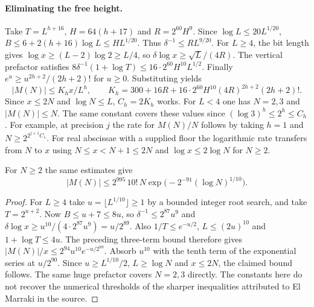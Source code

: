 \paragraph{Eliminating the free height.}
Take $T=L^{h+16}$, $H=64(h+17)$ and $R=2^{60}H^9$.
Since $\log L\le20 L^{1/20}$, $B\le6+2(h+16)\log L
\le H L^{1/20}$. Thus $\delta^{-1}\le R L^{9/20}$.
For $L\ge4$, the bit length gives
$\log x\ge(L-2)\log2\ge L/4$, so
$\delta\log x\ge\sqrt L/(4R)$. The vertical prefactor satisfies
$8\delta^{-1}(1+\log T)\le16\cdot2^{60}H^{10}L^{1/2}$.
Finally $e^u\ge u^{2h+2}/(2h+2)!$ for $u\ge0$. Substituting yields
\[
 |M(N)|\le K_h x/L^h,\qquad
 K_h=300+16R+
       16\cdot2^{60}H^{10}(4R)^{2h+2}(2h+2)! .
\]
Since $x\le2N$ and $\log N\le L$, $C_h=2K_h$ works. For $L<4$
one has $N=2,3$ and $|M(N)|\le N$. The same constant covers these
values since $(\log 3)^h\le2^h\le C_h$.
For example, at precision $j$ the rate for $M(N)/N$ follows by
taking $h=1$ and $N\ge 2^{2^{j+1}C_1}$. For real abscissae with a
supplied floor the logarithmic rate transfers from $N$ to $x$ using
$N\le x<N+1\le2N$ and $\log x\le2\log N$ for $N\ge2$.

\begin{corollary}
For $N\ge2$ the same estimates give
\[
 |M(N)|\le 2^{995}\,10!\,N
            \exp\bigl(-2^{-91}(\log N)^{1/10}\bigr).
\]
\end{corollary}
\begin{proof}
For $L\ge4$ take $u=\lfloor L^{1/10}\rfloor\ge1$ by a bounded
integer root search, and take $T=2^{u+2}$. Now $B\le u+7\le8u$,
so $\delta^{-1}\le 2^{87}u^9$ and
$\delta\log x\ge u^{10}/(4\cdot2^{87}u^9)=u/2^{89}$.
Also $1/T\le e^{-u/2}$, $L\le(2u)^{10}$ and $1+\log T\le4u$.
The preceding three-term bound therefore gives
$|M(N)|/x\le2^{94}u^{10}e^{-u/2^{89}}$.
Absorb $u^{10}$ with the tenth term of the exponential series at
$u/2^{90}$. Since $u\ge L^{1/10}/2$, $L\ge\log N$ and $x\le2N$,
the claimed bound follows. The same huge prefactor covers $N=2,3$
directly. The constants here do not recover the numerical thresholds
of the sharper inequalities attributed to El Marraki in the source.
\end{proof}
